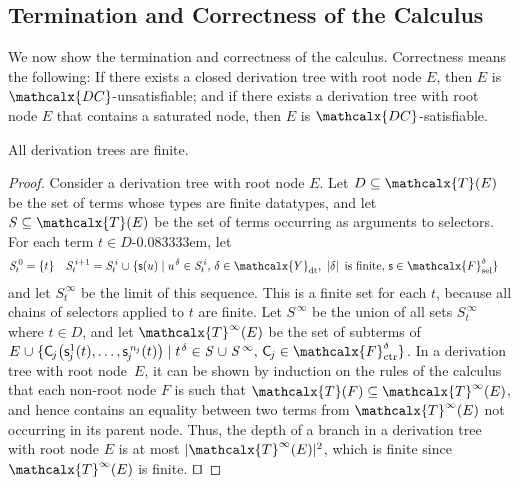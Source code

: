 \documentclass[smallcondensed,draft]{svjour3}
\newcommand\typ[1]{^{\vthinspace #1}}
\newcommand\afterDot{\;} %
\newcommand\const[1]{\textsf{#1}}
\newcommand\xqed{{\hfill$\scriptstyle\squareforqed$}}
\newcommand{\Ec}{E}
\newcommand{\Fc}{F}
\newcommand{\tEc}{\Terms(\Ec)}
\newcommand{\tcEc}{\Terms^\infty(\Ec)}
\newcommand\SSS{\mathit{S}}
\newcommand\SSSS[1]{\mathit{S}^{\,#1}}
\newcommand{\thD}{\mathcalx{DC}}
\newcommand\Terms{\mathcalx{T}}
\newcommand\Types{\mathcalx{Y}}
\newcommand\Funcs{\mathcalx{F}}
\newcommand\Data{\Types_{\mathrm{dt}}}
\newcommand\Ctr{\Funcs_{\smash{\mathrm{ctr}}}}
\newcommand\Sel{\Funcs_{\smash{\mathrm{sel}}}}
\newcommand\vthinspace{\kern+0.083333em}
\newcommand\negvthinspace{\kern-0.083333em}
\begin{document}
\subsection{Termination and Correctness of the Calculus}
\label{sec:termination-and-correctness}

We now show the termination and correctness of the calculus.
Correctness means the following:
If there exists a closed derivation tree with root node
$\Ec$, then $\Ec$ is $\thD$-unsatisfiable; and if there exists
a derivation tree with root node $\Ec$ that contains a saturated node, then
$\Ec$ is $\thD$-satisfiable.

\begin{theorem}[Termination]%
\label{thm:t}%
\afterDot
All derivation trees are finite.
\end{theorem}
\begin{proof}
Consider a derivation tree with root node $\Ec$. Let $D \subseteq \tEc$ be the
set of terms whose types are finite datatypes, and let $\SSS \subseteq \tEc$ be
the set of terms occurring as arguments to selectors. For each term $t \in
D$\negvthinspace, let
\begin{align*}
\smash{\SSSS 0_t} & = \{ t \}
& \smash{\SSSS {i+1}_t} & = \smash{\SSSS i_t \mathrel\cup \{ \const s( u ) \mid u\typ{\delta} \in \SSSS i_t{,}~ \delta \in \Data{,}~ \left|\delta\right| \text{ is finite}{,}~ \const{s} \in \Sel^{\delta}}  \}
\end{align*}
and let $\SSSS \infty_t$ be the limit of this sequence.
This is a finite set for each $t$, 
because all chains of selectors applied to $t$ are finite.
Let $\SSSS \infty$ be the union of all sets $\SSSS \infty_t$ where $t \in D$,
and let $\tcEc$ be the set of subterms of
%
$\Ec \mathrel\cup \{ \smash{\const C_{\negvthinspace j}\bigl( \const s^1_{\negvthinspace j}( t ), \ldots, \const s^{\smash{\,n_{\negvthinspace j}}}_{\negvthinspace j}( t ) \bigr)} \mid \smash{t\typ{\delta} \in \SSS \mathrel\cup \SSSS \infty{,}~ \const C_{\negvthinspace j} \in \smash{\Ctr^\delta}} \}$.
%
In a derivation tree with root node~$\Ec$,
it can be shown by induction
on the rules of the calculus that each non-root node $\Fc$ is such that
$\Terms(\Fc) \subseteq \tcEc$, and hence contains an equality between two terms from $\tcEc$ not occurring in its parent node.
Thus, the depth of a branch in a derivation tree with root node $\Ec$ is at most $\left| \smash{\tcEc}\vphantom{X} \right|{\!}^2$,
which is finite since $\tcEc$ is finite.
\xqed
\end{proof}
\end{document}

